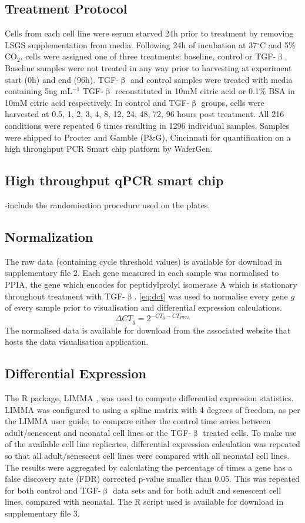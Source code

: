 \documentclass[alpha-refs]{wiley-article}
\newcommand{\tgf}{TGF-$\upbeta$}
\begin{document}
\subsection{Treatment Protocol}
Cells from each cell line were serum starved 24h prior to treatment by removing LSGS supplementation from media. Following 24h of incubation at 37$^{\circ}$C and 5\% CO$_2$, cells were assigned one of three treatments: baseline, control or \tgf{}. Baseline samples were not treated in any way prior to harvesting at experiment start (0h) and end (96h). \tgf{} and control samples were treated with media containing 5ng mL$^{-1}$ \tgf{} reconstituted in 10mM citric acid or 0.1\% BSA in 10mM citric acid respectively. In control and \tgf{} groups, cells were harvested at 0.5, 1, 2, 3, 4, 8, 12, 24, 48, 72, 96 hours post treatment. All 216 conditions were repeated 6 times resulting in 1296 individual samples. Samples were shipped to Procter and Gamble (P\&G), Cincinnati for quantification on a high throughput PCR Smart chip platform by WaferGen.

\subsection{High throughput qPCR smart chip}
-include the randomisation procedure used on the plates. 

\subsection{Normalization}
The raw data (containing cycle threshold values) is available for download in supplementary file 2. Each gene measured in each sample was normalised to PPIA, the gene which encodes for peptidylprolyl isomerase A which is stationary throughout treatment with \tgf{}. \cref{eq:dct} was used to normalise every gene $g$ of every sample prior to visualisation and differential expression calculations. 
\begin{equation}
\Delta CT_g = 2^{-CT_g - CT_{PPIA}} 
\label{eq:dct}
\end{equation}
The normalised data is available for download from the associated website that hosts the data visualisation application.

\subsection{Differential Expression}
The R package, LIMMA \citep{Smyth2004,Smyth2005, Ritchie2015}, was used to compute differential expression statistics. LIMMA was configured to using a spline matrix with 4 degrees of freedom, as per the LIMMA user guide, to compare either the control time series between adult/senescent and neonatal cell lines or the \tgf{} treated cells. To make use of the available cell line replicates, differential expression calculation was repeated so that all adult/senescent cell lines were compared with all neonatal cell lines. The results were aggregated by calculating the percentage of times a gene has a false discovery rate (FDR) corrected p-value smaller than 0.05. This was repeated for both control and \tgf{} data sets and for both adult and senescent cell lines, compared with neonatal. The R script used is available for download in supplementary file 3.  
\end{document}
